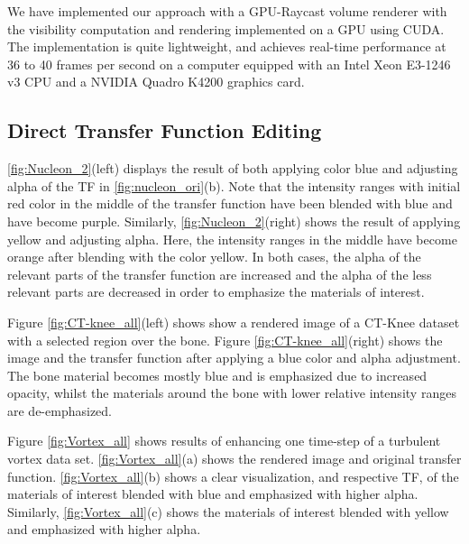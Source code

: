 \documentclass[twoside,twocolumn,10pt]{article}
\begin{document}
We have implemented our approach with a GPU-Raycast volume renderer with the visibility computation and rendering implemented on a GPU using CUDA. The implementation is quite lightweight, and achieves real-time performance at 36 to 40 frames per second on a computer equipped with an Intel Xeon E3-1246 v3 CPU and a NVIDIA Quadro K4200 graphics card.

\subsection{Direct Transfer Function Editing}

\autoref{fig:Nucleon_2}(left) displays the result of both applying color blue and adjusting alpha of the TF in \autoref{fig:nucleon_ori}(b). Note that the intensity ranges with initial red color in the middle of the transfer function have been blended with blue and have become purple.
Similarly, \autoref{fig:Nucleon_2}(right) shows the result of applying yellow and adjusting alpha. Here, the intensity ranges in the middle have become orange after blending with the color yellow. 
In both cases, the alpha of the relevant parts of the transfer function are increased and the alpha of the less relevant parts are decreased in order to emphasize the materials of interest.

Figure \ref{fig:CT-knee_all}(left) shows show a rendered image of a CT-Knee dataset with a selected region over the bone. Figure \ref{fig:CT-knee_all}(right) shows the image and the transfer function after applying a blue color and alpha adjustment. The bone material becomes mostly blue and is emphasized due to increased opacity, whilst the materials around the bone with lower relative intensity ranges are de-emphasized.

Figure \ref{fig:Vortex_all} shows results of enhancing one time-step of a turbulent vortex data set.
\autoref{fig:Vortex_all}(a) shows the rendered image and original transfer function.
\autoref{fig:Vortex_all}(b) shows a clear visualization, and respective TF, of the materials of interest blended with blue and emphasized with higher alpha.
Similarly, \autoref{fig:Vortex_all}(c) shows the materials of interest blended with yellow and emphasized with higher alpha.
\end{document}

